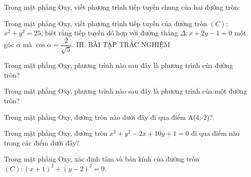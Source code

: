 \documentclass[12pt,a4paper]{book}
\begin{document}
\begin{ex}
Trong mặt phẳng Oxy, viết phương trình tiếp tuyến chung của hai đường tròn:
\loigiai{}
\end{ex}

\begin{ex}
Trong mặt phẳng Oxy, viết phương trình tiếp tuyến của đường tròn $(C)$: $x^2 + y^2 = 25$, biết rằng tiếp tuyến đó hợp với đường thẳng $\Delta: x + 2y - 1 = 0$ một góc $\alpha$ mà $\cos \alpha = \dfrac{2}{\sqrt{5}}$.
III. BÀI TẬP TRẮC NGHIỆM
\loigiai{}
\end{ex}

\begin{ex}
Trong mặt phẳng Oxy, phương trình nào sau đây là phương trình của đường tròn?
\loigiai{}
\end{ex}

\begin{ex}
Trong mặt phẳng Oxy, phương trình nào sau đây là phương trình của một đường tròn?
\loigiai{}
\end{ex}

\begin{ex}
Trong mặt phẳng Oxy, đường tròn nào dưới đây đi qua điểm A(4;-2)?
\loigiai{}
\end{ex}

\begin{ex}
Trong mặt phẳng Oxy, đường tròn $x^2 + y^2 - 2x + 10y + 1 = 0$ đi qua điểm nào trong các điểm dưới đây?
\loigiai{}
\end{ex}

\begin{ex}
Trong mặt phẳng Oxy, xác định tâm và bán kính của đường tròn $(C): (x+1)^2 + (y-2)^2 = 9$.
\loigiai{}
\end{ex}
\end{document}
